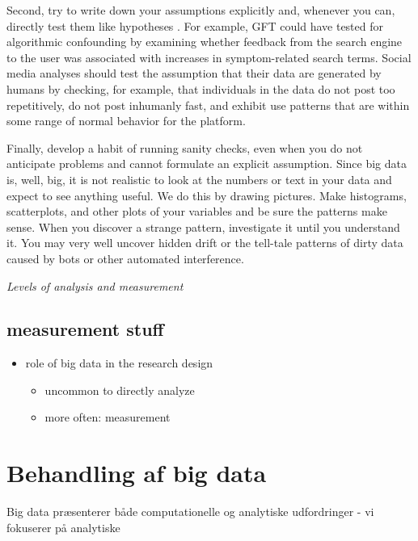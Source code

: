 \documentclass[12pt,]{article}
\providecommand{\tightlist}{%
  \setlength{\itemsep}{0pt}\setlength{\parskip}{0pt}}
\begin{document}
Second, try to write down your assumptions explicitly and, whenever you
can, directly test them like hypotheses \citep[see,][]{LBCC16}. For
example, GFT could have tested for algorithmic confounding by examining
whether feedback from the search engine to the user was associated with
increases in symptom-related search terms. Social media analyses should
test the assumption that their data are generated by humans by checking,
for example, that individuals in the data do not post too repetitively,
do not post inhumanly fast, and exhibit use patterns that are within
some range of normal behavior for the platform.

Finally, develop a habit of running sanity checks, even when you do not
anticipate problems and cannot formulate an explicit assumption. Since
big data is, well, big, it is not realistic to look at the numbers or
text in your data and expect to see anything useful. We do this by
drawing pictures. Make histograms, scatterplots, and other plots of your
variables and be sure the patterns make sense. When you discover a
strange pattern, investigate it until you understand it. You may very
well uncover hidden drift or the tell-tale patterns of dirty data caused
by bots or other automated interference.

\emph{Levels of analysis and measurement}

\hypertarget{measurement-stuff}{%
\subsection{measurement stuff}\label{measurement-stuff}}

\begin{itemize}
\tightlist
\item
  role of big data in the research design

  \begin{itemize}
  \tightlist
  \item
    uncommon to directly analyze
  \item
    more often: measurement
  \end{itemize}
\end{itemize}

\hypertarget{behandling-af-big-data}{%
\section{Behandling af big data}\label{behandling-af-big-data}}

Big data præsenterer både computationelle og analytiske udfordringer -
vi fokuserer på analytiske
\end{document}

